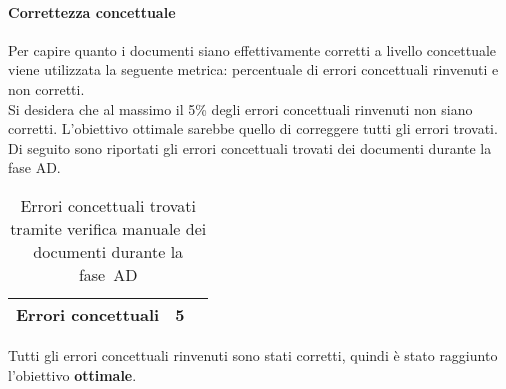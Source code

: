\documentclass[../PianoDiQualifica.tex]{subfiles}
\begin{document}
\begin{appendices}
			\paragraph{Correttezza concettuale}
			Per capire quanto i documenti siano effettivamente corretti a livello concettuale viene utilizzata la seguente metrica: percentuale di errori concettuali rinvenuti e non corretti.\\
			Si desidera che al massimo il 5\% degli errori concettuali rinvenuti non siano corretti. L’obiettivo ottimale sarebbe quello di correggere tutti gli errori trovati. \\
			Di seguito sono riportati gli errori concettuali trovati dei documenti durante la fase AD.
			\begin{table}[H]
				\centering
				\begin{tabular}{l * {2}{c}}
					\midrule
					Errori concettuali & 5 \\
					\midrule
				\end{tabular}
				\caption{Errori concettuali trovati tramite verifica manuale dei documenti durante la fase\g\ AD}
				\label{tab:errori_concettuali}
			\end{table}
			Tutti gli errori concettuali rinvenuti sono stati corretti, quindi è stato raggiunto l'obiettivo \textbf{ottimale}.
			
\end{appendices}
\end{document}
